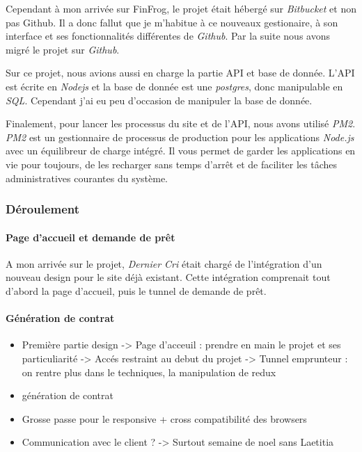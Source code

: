 \bigskip

Cependant à mon arrivée sur FinFrog, le projet était hébergé sur
\emph{Bitbucket} et non pas Github. Il a donc fallut que je m'habitue à
ce nouveaux gestionaire, à son interface et ses fonctionnalités
différentes de \emph{Github}. Par la suite nous avons migré le projet
sur \emph{Github}.

\bigskip

Sur ce projet, nous avions aussi en charge la partie API et base de
donnée. L'API est écrite en \emph{Nodejs} et la base de donnée est une
\emph{postgres}, donc manipulable en \emph{SQL}. Cependant j'ai eu peu
d'occasion de manipuler la base de donnée.

\bigskip

Finalement, pour lancer les processus du site et de l'API, nous avons
utilisé \emph{PM2}. \emph{PM2} est un gestionnaire de processus de
production pour les applications \emph{Node.js} avec un équilibreur de
charge intégré. Il vous permet de garder les applications en vie pour
toujours, de les recharger sans temps d'arrêt et de faciliter les tâches
administratives courantes du système.

\bigskip

\subsubsection{Déroulement}\label{duxe9roulement-1}

\paragraph{Page d'accueil et demande de
prêt}\label{page-daccueil-et-demande-de-pruxeat}

\bigskip

A mon arrivée sur le projet, \emph{Dernier Cri} était chargé de
l'intégration d'un nouveau design pour le site déjà existant. Cette
intégration comprenait tout d'abord la page d'accueil, puis le tunnel de
demande de prêt.

\bigskip

\bigskip

\paragraph{Génération de contrat}\label{guxe9nuxe9ration-de-contrat}

\bigskip

\bigskip

\begin{itemize}
\item
  Première partie design -\textgreater{} Page d'acceuil : prendre en
  main le projet et ses particuliarité -\textgreater{} Accés restraint
  au debut du projet -\textgreater{} Tunnel emprunteur : on rentre plus
  dans le techniques, la manipulation de redux
\item
  génération de contrat
\item
  Grosse passe pour le responsive + cross compatibilité des browsers
\item
  Communication avec le client ? -\textgreater{} Surtout semaine de noel
  sans Laetitia
\end{itemize}


